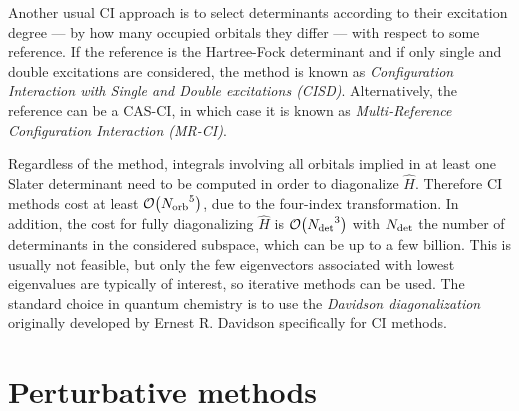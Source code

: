 \documentclass[./thesis.tex]{subfiles}
\begin{document}
Another usual CI approach is to select determinants according to their excitation degree --- by how many occupied orbitals they differ --- with respect to some reference. If the reference is the Hartree-Fock determinant and if only single and double excitations are considered, the method is known as \emph{Configuration Interaction with Single and Double excitations (CISD)}. Alternatively, the reference can be a CAS-CI, in which case it is known as \emph{Multi-Reference Configuration Interaction (MR-CI)}.

Regardless of the method, integrals involving all orbitals implied in at least one Slater determinant need to be computed in order to diagonalize $\widehat{H}$. Therefore CI methods cost at least $\order{\Norb^5}$, due to the four-index transformation.
In addition, the cost for fully diagonalizing $\widehat{H}$ is $\order{\Ndet^3}$ with ${N_\text{det}}$ the number of determinants in the considered subspace, which can be up to a few billion. This is usually not feasible, but only the few eigenvectors associated with lowest eigenvalues are typically of interest, so iterative methods can be used. The standard choice in quantum chemistry is to use the \emph{Davidson diagonalization} originally developed by Ernest R. Davidson\cite{Davidson_1975} specifically for CI methods. 


\section{Perturbative methods}

\end{document}
